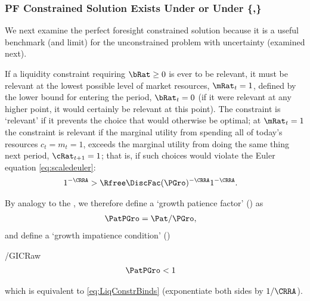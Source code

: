 \documentclass[BufferStockTheory]{subfiles}
\providecommand{\LtxDir}{LaTeX/}
\begin{document}
\providecommand{\figName}{RelatePFGICFHWCRICPFFVAC} %
\providecommand{\figFile}{\figName} %
\hypertarget{\figName}{}

\hypertarget{PF-Constrained-Solution}{}
\hypertarget{Constrained-Solution}{}
\subsubsection{PF Constrained Solution Exists Under {\RIC} or Under \{\cncl{\RIC},\GICRaw\}}\label{subsec:PFCon}

We next examine the perfect foresight constrained solution because it is a useful benchmark (and limit) for the unconstrained problem with uncertainty (examined next).

If a liquidity constraint requiring $\bRat \geq 0$ is ever to be relevant, it must be
relevant at the lowest possible level of market resources,
$\mRat_{t}=1$, defined by the lower bound for entering the period, 
$\bRat_{t}=0$ (if it were relevant at any higher point, it would certainly be relevant at this point).  The constraint is `relevant' if
it prevents the choice that would otherwise be optimal; at
$\mRat_{t}=1$ the constraint is relevant if the marginal utility from spending all of today's
resources $c_{t}=m_{t}=1$, exceeds the marginal utility from
doing the same thing next period, $\cRat_{t+1}=1$; that is, if such
choices would violate the Euler equation \eqref{eq:scaledeuler}:
\begin{align}
  1^{-\CRRA}  & > \Rfree \DiscFac (\PGro)^{-\CRRA}1^{-\CRRA}  \label{eq:LiqConstrBinds}.
\end{align}

\hypertarget{GPFRaw}{}
\hypertarget{GICRaw}{}
By analogy to the \RPF, we therefore define a `growth patience factor' (\GPFRaw) as
\begin{align}
  \PatPGro  & = {\Pat}/\PGro,  \label{eq:GPFRaw}
\end{align}
and define a `growth impatience condition' (\GICRaw)
\begin{verbatimwrite}{\EqDir/GICRaw}
\begin{align}
  \PatPGro &  < 1   \label{eq:GICRaw}
\end{align}
\end{verbatimwrite}

which is equivalent to \eqref{eq:LiqConstrBinds} (exponentiate both
sides by $1/\CRRA$).
\end{document}
